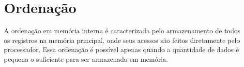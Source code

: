 \section{Ordenação}


%
%
%
%
%
%



A ordenação em memória interna é caracterizada pelo armazenamento de todos os registros na memória principal, onde seus acessos são feitos diretamente pelo processador. Essa ordenação é possível apenas quando a quantidade de dados é pequena o suficiente para ser armazenada em memória. 

